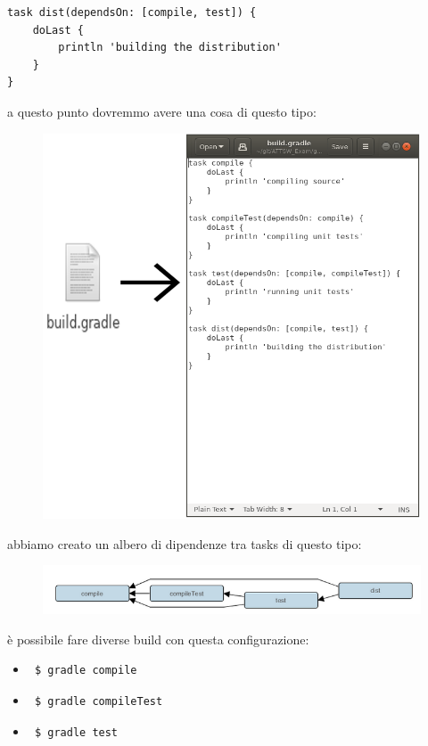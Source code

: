 \documentclass{article}
\begin{document}
\begin{flushleft}
\begin{verbatim}
task dist(dependsOn: [compile, test]) {
    doLast {
        println 'building the distribution'
    }
} \end{verbatim}
a questo punto dovremmo avere una cosa di questo tipo:
\begin{figure}[H]
\includegraphics[scale=0.46]{gradleexamplefirst.png}
\end{figure} 
abbiamo creato un albero di dipendenze tra tasks di questo tipo:
\label{taskdip}
\begin{figure}[H]
\includegraphics[scale=0.70]{taskdipendence.png}
\end{figure}
è possibile fare diverse build con questa configurazione:
\begin{itemize}
    \item \begin{verbatim} $ gradle compile \end{verbatim}
    \item \begin{verbatim} $ gradle compileTest \end{verbatim}
    \item \begin{verbatim} $ gradle test \end{verbatim}

\end{itemize}
\end{flushleft}
\end{document}
